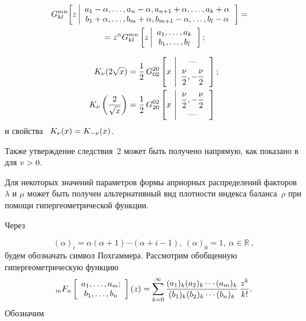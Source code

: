 \begin{multicols}{2}
    \vspace*{-12pt}

\noindent
\begin{multline*}
 \!\!\! \hspace*{-5pt}G_{k l}^{m n}\!
    \left[z \left\vert
    \begin{array}{c}
    a_1-\alpha,\dots,a_n-\alpha,a_{n+1}+\alpha,\dots,a_k+\alpha\\
    b_1+\alpha,\dots,b_m+\alpha, b_{m+1}-\alpha,\dots,b_l-\alpha
    \end{array}\right.\right] ={}\hspace*{-3pt}
\\
{}=z^\alpha G_{k l}^{m n}
    \left[z \left\vert 
    \begin{array}{c}
    a_1,\ldots,a_k\\
    b_1,\ldots,b_l
    \end{array}\right.
    \right];
    \end{multline*}
    
    \vspace*{-12pt}

\noindent
\begin{align*}
K_\nu(2\sqrt{x}) &=
    \displaystyle\frac{\displaystyle 1\mathstrut}{\displaystyle 2\mathstrut}\, G_{0 2}^{2 0}
    \left[x \,\left\vert
    \begin{array}{c}
\mbox{---}\\
    \displaystyle\frac{\displaystyle \nu\mathstrut}{\displaystyle 2\mathstrut}, -\displaystyle\frac{\displaystyle \nu\mathstrut}{\displaystyle 2\mathstrut}
    \end{array}\right.
    \right];
    \\
    K_\nu\left(\displaystyle\frac{\displaystyle 2\mathstrut}{\displaystyle \sqrt{x}\mathstrut}\right)& =
    \displaystyle\frac{\displaystyle 1\mathstrut}{\displaystyle 2\mathstrut}\,G_{2 0}^{0 2}
    \left[x \,\left\vert 
    \begin{array}{c}
    \displaystyle\frac{\displaystyle \nu\mathstrut}{\displaystyle 2\mathstrut}, -\displaystyle\frac{\displaystyle \nu\mathstrut}{\displaystyle 2\mathstrut}\\
    \mbox{---}
    \end{array}\right.\right]
    \end{align*}
и свойства~\cite{GR1971} $K_\nu(x) \hm= K_{-\nu}(x)$.

Также утверждение следствия~2 может быть получено напрямую, 
как показано в~\cite{Carolynne2013} для $v\hm>0$.

\smallskip

Для некоторых значений параметров формы априорных распределений факторов~$\lambda$ и $\mu$ 
может быть получен альтернативный вид плотности индекса баланса~$\rho$ при помощи гипергеометрической функции.

Через

\noindent
$$
(\alpha)_i=\alpha (\alpha+1)\cdots(\alpha+i-1),\  (\alpha)_0=1,\ 
\alpha\in\mathbb{R}\,,
$$
будем обозначать символ Похгаммера.
Рассмотрим обобщенную гипергеометрическую функцию~\cite{Prudnikov1}
$$
{}_mF_n\left[
\begin{array}{c}
a_1,\ldots, a_m;\\
b_1,\ldots, b_n
\end{array}\right]\left(
z
\right)
=\sum\limits_{k=0}^\infty \displaystyle\frac{\displaystyle (a_1)_k(a_2)_k\cdots (a_m)_k\mathstrut}{\displaystyle (b_1)_k(b_2)_k\cdots (b_n)_k\mathstrut}\,
\displaystyle\frac{\displaystyle z^k\mathstrut}{\displaystyle k!\mathstrut}.$$
Обозначим


\end{multicols}
